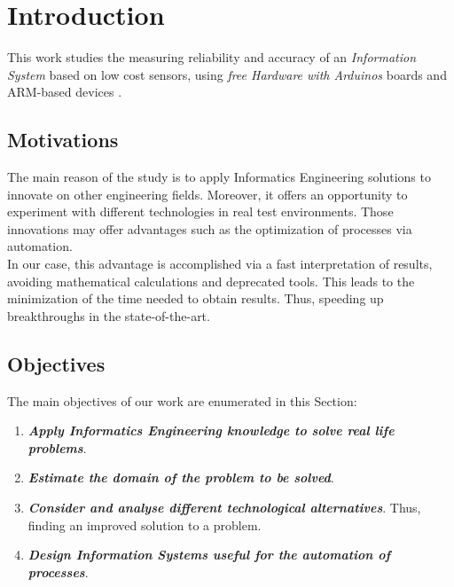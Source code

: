 
\chapter{Introduction}
\newpage


This work studies the measuring reliability and accuracy of an \textit{Information System} based on low cost sensors, using \textit{free Hardware with Arduinos} \cite{arduino_mega, jjtorres_hardware_2014} boards and ARM-based devices \cite{arm, arm_architecture}.\\

\section{Motivations}

The main reason of the study is to apply Informatics Engineering solutions to innovate on other engineering fields. Moreover, it offers an opportunity to experiment with different technologies in real test environments. Those innovations may offer advantages such as the optimization of processes via automation. \\ 

In our case, this advantage is accomplished via a fast interpretation of results, avoiding mathematical calculations and deprecated tools. This leads to the minimization of the time needed to obtain results. Thus, speeding up breakthroughs in the state-of-the-art. \\

\section{Objectives}

The main objectives of our work are enumerated in this Section:

\begin{enumerate}

\item \textbf{\textit{Apply Informatics Engineering knowledge to solve real life problems}}.

\item \textbf{\textit{Estimate the domain of the problem to be solved}}. 

\item \textbf{\textit{Consider and analyse different technological alternatives}}. Thus, finding an improved solution to a problem. 

\item \textbf{\textit{Design Information Systems useful for the automation of processes}}.

\end{enumerate}

